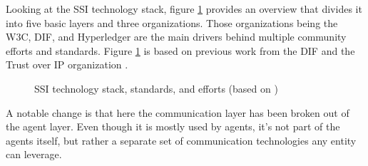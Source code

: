     	Looking at the \ac{SSI} technology stack, figure \ref{figure: ssi_stack_detail} provides an overview that divides it into five basic layers and three organizations. Those organizations being the W3C, \acs{DIF}, and Hyperledger are the main drivers behind multiple community efforts and standards. Figure \ref{figure: ssi_stack_detail} is based on previous work from the \ac{DIF} and the Trust over IP organization \cite{heck_ssi_2020,yildiz_layers_2021,davie_0289_2021}.
    	
		\begin{figure}[ht]
            \centering
            \caption[SSI technology stack, standards, and efforts]{\ac{SSI} technology stack, standards, and efforts (based on \cite{heck_ssi_2020, yildiz_layers_2021,davie_0289_2021})}
            \label{figure: ssi_stack_detail}
        \end{figure}
        
        A notable change is that here the communication layer has been broken out of the agent layer. Even though it is mostly used by agents, it's not part of the agents itself, but rather a separate set of communication technologies any entity can leverage. 
        
